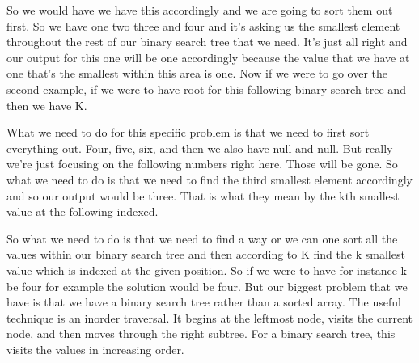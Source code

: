\expandafter\def\csname sourceexcerpt@35\endcsname{%
So we would have we have this accordingly and we are going to sort them out first. So
we have one two three and four and it's asking us the smallest element throughout the
rest of our binary search tree that we need. It's just all right and our output for
this one will be one accordingly because the value that we have at one that's the
smallest within this area is one. Now if we were to go over the second example, if we
were to have root for this following binary search tree and then we have K.

What we need to do for this specific problem is that we need to first sort everything
out. Four, five, six, and then we also have null and null. But really we're just
focusing on the following numbers right here. Those will be gone. So what we need to
do is that we need to find the third smallest element accordingly and so our output
would be three. That is what they mean by the kth smallest value at the following
indexed.

So what we need to do is that we need to find a way or we can one sort all the values
within our binary search tree and then according to K find the k smallest value which
is indexed at the given position. So if we were to have for instance k be four for
example the solution would be four. But our biggest problem that we have is that we
have a binary search tree rather than a sorted array. The useful technique is an
inorder traversal. It begins at the leftmost node, visits the current node, and then
moves through the right subtree. For a binary search tree, this visits the values in
increasing order.
}

